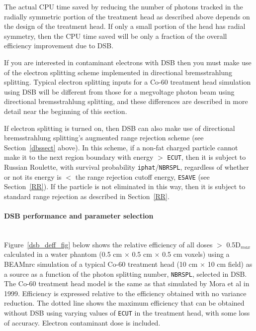 \documentclass[12pt,twoside]{article}
\begin{document}
The actual CPU time saved by reducing the number of photons tracked in the radially symmetric portion of
the treatment head as described above depends on the design of the treatment head.  If only a small portion
of the head has radial symmetry, then the CPU time saved will be only a fraction of the overall efficiency
improvement due to DSB.

If you are interested in contaminant electrons with DSB then you must make use of
the electron splitting scheme implemented in directional bremsstrahlung splitting.  Typical electron splitting
inputs for a Co-60 treatment head simulation using DSB will be different from those for a megvoltage
photon beam using directional bremsstrahlung splitting, and these differences are described in more detail near
the beginning of this section.

If electron splitting is turned on, then DSB can also make use of directional bremsstrahlung splitting's augmented range rejection scheme (see Section~\ref{dbssect} above).  In this scheme, if a non-fat charged particle cannot make it to
the next region boundary with energy $>$ {\tt ECUT}, then it is subject to Russian Roulette, with survival
probability {\tt iphat}/{\tt NBRSPL}, regardless of whether or not its energy is $<$ the range rejection cutoff
energy, {\tt ESAVE} (see Section~\ref{RR}).  If the particle is not eliminated in this way, then
it is subject to standard range rejection as described in Section~\ref{RR}.

\paragraph{DSB performance and parameter selection}\mbox{}\\

Figure~\ref{dsb_deff_fig} below shows the relative efficiency of all doses $>$ 0.5D$_{max}$ calculated in
a water phantom (0.5 cm $\times$ 0.5 cm $\times$ 0.5 cm voxels)  using a BEAMnrc simulation of a
typical Co-60
treatment head (10 cm $\times$ 10 cm field) as a source as a function of the photon
splitting number, {\tt NBRSPL}, selected in DSB.  The Co-60 treatment head model is the same as that
simulated by Mora et al\cite{Mo99} in 1999.  Efficiency is expressed relative
to the efficiency obtained with no variance reduction.  The dotted line shows the maximum efficiency
that can be obtained without DSB using varying values of {\tt ECUT} in the treatment head, with some loss of
accuracy.  Electron contaminant dose is included.
\end{document}
